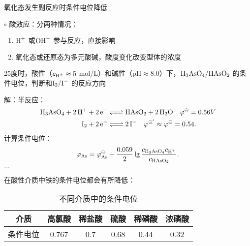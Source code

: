 \begin{notation}
    氧化态发生副反应时条件电位降低
\end{notation}
$\circ$ 酸效应：分两种情况：\begin{enumerate}
    \item $\ce{H+}$ 或$\ce{OH-}$ 参与反应，直接影响
    \item 氧化态或还原态为多元酸碱，酸度变化改变型体的浓度
\end{enumerate}
\begin{eg}
    25度时，酸性（$c_{\ce{H+}}\approx 5$ mol/L）和碱性（$\text{pH}\approx 8.0$）下，$\ce{H_3AsO_4}/\ce{HAsO_2}$ 的条件电位，判断和$\ce{I_2}/\ce{I-}$ 的反应方向
\end{eg}
解：半反应：
\begin{align*}
    \ce{H_3AsO_4 +2H+ + 2e-}&\ce{<=>[][]}\ce{HAsO_2 +2H_2O}\quad \varphi^{\ominus}=0.56V\\
    \ce{I_2 +2e-}&\ce{<=>[][]}\ce{2I-}\quad \varphi ^{\ominus'}\approx \varphi^{\ominus}=0.54
.\end{align*}
计算条件电位：
\[
    \varphi_\text{As}=\varphi^{\ominus}_\text{As}+\frac{0.059}{2}\lg \frac{c_{\ce{H_3AsO_4}}c_{\ce{H+}}}{c_{\ce{HAsO_2}}}
.\]
$\ldots $
\begin{notation}
    在酸性介质中铁的条件电位都会有所降低：
    \begin{table}[htpb]
        \centering
        \caption{不同介质中的条件电位}
        \label{tab:不同介质中的条件电位}
        \begin{tabular}{cccccc}
        \toprule
        介质 & 高氯酸 & 稀盐酸 & 硫酸 & 稀磷酸 & 浓磷酸\\
        \midrule
        条件电位 & 0.767 & 0.7 & 0.68 & 0.44 & 0.32\\
        \bottomrule
        \end{tabular}
    \end{table}
\end{notation}
